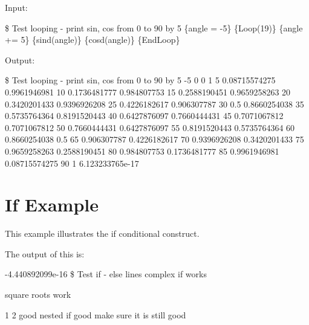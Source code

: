 Input:
\begin{apinp}
\$  Test  looping  -  print  sin,  cos  from  0  to  90  by  5
\{angle  =  -5\}      
\{Loop(19)\}      
\{angle  +=  5\}  \{sind(angle)\}  \{cosd(angle)\}
\{EndLoop\}
\end{apinp}
Output:        
\begin{apout}
\$  Test  looping  -  print  sin,  cos  from  0  to 90  by  5
-5        
 0  0    1  
 5  0.08715574275 0.9961946981
10  0.1736481777  0.984807753  
15  0.2588190451  0.9659258263
20  0.3420201433  0.9396926208
25  0.4226182617  0.906307787  
30  0.5    0.8660254038
35  0.5735764364  0.8191520443
40  0.6427876097  0.7660444431
45  0.7071067812  0.7071067812
50  0.7660444431  0.6427876097
55  0.8191520443  0.5735764364
60  0.8660254038  0.5  
65  0.906307787  0.4226182617
70  0.9396926208  0.3420201433
75  0.9659258263  0.2588190451
80  0.984807753  0.1736481777
85  0.9961946981  0.08715574275
90  1    6.123233765e-17
\end{apout}

\section{If Example}
This example illustrates the if conditional construct.


The output of this is:
\begin{apout}
-4.440892099e-16
\$ Test if - else lines
 complex if works

       square roots work

1 2
     good nested if
  good
  make sure it is still good
\end{apout}

